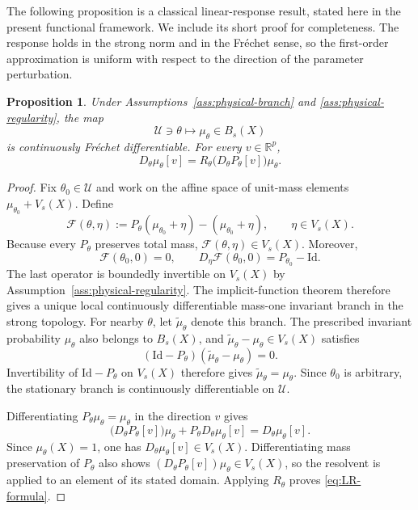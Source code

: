 \documentclass[11pt]{article}
\newtheorem{proposition}[theorem]{Proposition}
\theoremstyle{definition}
\theoremstyle{remark}
\newcommand{\Id}{\mathrm{Id}}
\newcommand{\R}{\mathbb{R}}
\begin{document}
{The following proposition is a classical linear-response
result, stated here in the present functional framework.
We include its short proof for completeness.
The response holds in the strong norm and in the
Fr\'echet sense, so the first-order approximation is
uniform with respect to the direction of the parameter
perturbation.

\begin{proposition}
\label{prop:physical-LR}
Under Assumptions~\ref{ass:physical-branch} and
\ref{ass:physical-regularity}, the map
\[
  \mathcal U\ni\theta\longmapsto\mu_\theta\in B_s(X)
\]
is continuously Fr\'echet differentiable.  For every \(v\in\R^p\),
\begin{equation}
  \boxed{
  D_\theta\mu_\theta[v]
  =R_\theta
  \bigl(D_\theta P_\theta[v]\bigr)\mu_\theta.}
  \label{eq:LR-formula}
\end{equation}
\end{proposition}

\begin{proof}
Fix \(\theta_0\in\mathcal U\) and work on the affine space of unit-mass
elements \(\mu_{\theta_0}+V_s(X)\).  Define
\[
  \mathcal F(\theta,\eta)
  :=P_\theta(\mu_{\theta_0}+\eta)-(\mu_{\theta_0}+\eta),
  \qquad \eta\in V_s(X).
\]
Because every \(P_\theta\) preserves total mass,
\(\mathcal F(\theta,\eta)\in V_s(X)\).  Moreover,
\[
  \mathcal F(\theta_0,0)=0,
  \qquad
  D_\eta\mathcal F(\theta_0,0)=P_{\theta_0}-\Id.
\]
The last operator is boundedly invertible on \(V_s(X)\) by
Assumption~\ref{ass:physical-regularity}.  The implicit-function theorem therefore gives a unique local continuously
differentiable mass-one invariant branch in the strong topology.  For nearby
\(\theta\), let \(\widetilde\mu_\theta\) denote this branch.  The prescribed
invariant probability \(\mu_\theta\) also belongs to \(B_s(X)\), and
\(\widetilde\mu_\theta-\mu_\theta\in V_s(X)\) satisfies
\[
  (\Id-P_\theta)(\widetilde\mu_\theta-\mu_\theta)=0.
\]
Invertibility of \(\Id-P_\theta\) on \(V_s(X)\) therefore gives
\(\widetilde\mu_\theta=\mu_\theta\).  Since \(\theta_0\) is arbitrary,
the stationary branch is continuously differentiable on \(\mathcal U\).

Differentiating \(P_\theta\mu_\theta=\mu_\theta\) in the direction \(v\)
gives
\[
  \bigl(D_\theta P_\theta[v]\bigr)\mu_\theta
  +P_\theta D_\theta\mu_\theta[v]
  =D_\theta\mu_\theta[v].
\]
Since \(\mu_\theta(X)=1\), one has
\(D_\theta\mu_\theta[v]\in V_s(X)\).  Differentiating mass preservation of
\(P_\theta\) also shows
\( (D_\theta P_\theta[v])\mu_\theta\in V_s(X)\), so the resolvent is applied
to an element of its stated domain.  Applying \(R_\theta\) proves
\eqref{eq:LR-formula}.
\end{proof}

}
\end{document}
